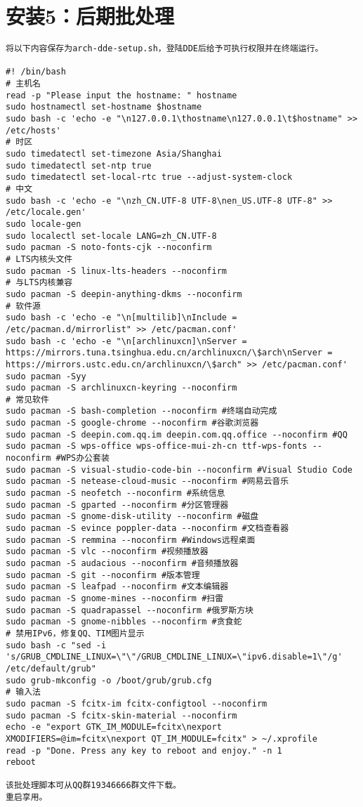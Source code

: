 \documentclass[a4paper,fontset=fandol,zihao=-4,linespread=1.2,oneside]{ctexbook}
\begin{document}
\section{安装5：后期批处理}
\begin{lstlisting}
将以下内容保存为arch-dde-setup.sh，登陆DDE后给予可执行权限并在终端运行。

#! /bin/bash
# 主机名
read -p "Please input the hostname: " hostname
sudo hostnamectl set-hostname $hostname
sudo bash -c 'echo -e "\n127.0.0.1\thostname\n127.0.0.1\t$hostname" >> /etc/hosts'
# 时区
sudo timedatectl set-timezone Asia/Shanghai
sudo timedatectl set-ntp true
sudo timedatectl set-local-rtc true --adjust-system-clock
# 中文
sudo bash -c 'echo -e "\nzh_CN.UTF-8 UTF-8\nen_US.UTF-8 UTF-8" >> /etc/locale.gen'
sudo locale-gen
sudo localectl set-locale LANG=zh_CN.UTF-8
sudo pacman -S noto-fonts-cjk --noconfirm
# LTS内核头文件
sudo pacman -S linux-lts-headers --noconfirm
# 与LTS内核兼容
sudo pacman -S deepin-anything-dkms --noconfirm
# 软件源
sudo bash -c 'echo -e "\n[multilib]\nInclude = /etc/pacman.d/mirrorlist" >> /etc/pacman.conf'
sudo bash -c 'echo -e "\n[archlinuxcn]\nServer = https://mirrors.tuna.tsinghua.edu.cn/archlinuxcn/\$arch\nServer = https://mirrors.ustc.edu.cn/archlinuxcn/\$arch" >> /etc/pacman.conf'
sudo pacman -Syy
sudo pacman -S archlinuxcn-keyring --noconfirm
# 常见软件
sudo pacman -S bash-completion --noconfirm #终端自动完成
sudo pacman -S google-chrome --noconfirm #谷歌浏览器
sudo pacman -S deepin.com.qq.im deepin.com.qq.office --noconfirm #QQ
sudo pacman -S wps-office wps-office-mui-zh-cn ttf-wps-fonts --noconfirm #WPS办公套装
sudo pacman -S visual-studio-code-bin --noconfirm #Visual Studio Code
sudo pacman -S netease-cloud-music --noconfirm #网易云音乐
sudo pacman -S neofetch --noconfirm #系统信息
sudo pacman -S gparted --noconfirm #分区管理器
sudo pacman -S gnome-disk-utility --noconfirm #磁盘
sudo pacman -S evince poppler-data --noconfirm #文档查看器
sudo pacman -S remmina --noconfirm #Windows远程桌面
sudo pacman -S vlc --noconfirm #视频播放器
sudo pacman -S audacious --noconfirm #音频播放器
sudo pacman -S git --noconfirm #版本管理
sudo pacman -S leafpad --noconfirm #文本编辑器
sudo pacman -S gnome-mines --noconfirm #扫雷
sudo pacman -S quadrapassel --noconfirm #俄罗斯方块
sudo pacman -S gnome-nibbles --noconfirm #贪食蛇
# 禁用IPv6，修复QQ、TIM图片显示
sudo bash -c "sed -i 's/GRUB_CMDLINE_LINUX=\"\"/GRUB_CMDLINE_LINUX=\"ipv6.disable=1\"/g' /etc/default/grub"
sudo grub-mkconfig -o /boot/grub/grub.cfg
# 输入法
sudo pacman -S fcitx-im fcitx-configtool --noconfirm
sudo pacman -S fcitx-skin-material --noconfirm
echo -e "export GTK_IM_MODULE=fcitx\nexport XMODIFIERS=@im=fcitx\nexport QT_IM_MODULE=fcitx" > ~/.xprofile
read -p "Done. Press any key to reboot and enjoy." -n 1
reboot

该批处理脚本可从QQ群19346666群文件下载。
重启享用。
\end{lstlisting}
\end{document}
